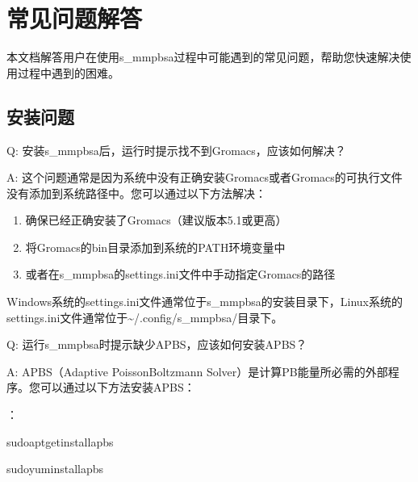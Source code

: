 \documentclass[letterpaper,10pt,english]{sphinxmanual}
\begin{document}
\sphinxstepscope


\chapter{常见问题解答}
\label{\detokenize{faq:id1}}\label{\detokenize{faq::doc}}
\sphinxAtStartPar
本文档解答用户在使用s\_mmpbsa过程中可能遇到的常见问题，帮助您快速解决使用过程中遇到的困难。


\section{安装问题}
\label{\detokenize{faq:id2}}
\sphinxAtStartPar
Q: 安装s\_mmpbsa后，运行时提示找不到Gromacs，应该如何解决？

\sphinxAtStartPar
A: 这个问题通常是因为系统中没有正确安装Gromacs或者Gromacs的可执行文件没有添加到系统路径中。您可以通过以下方法解决：
\begin{enumerate}
%
\item {} 
\sphinxAtStartPar
确保已经正确安装了Gromacs（建议版本5.1或更高）

\item {} 
\sphinxAtStartPar
将Gromacs的bin目录添加到系统的PATH环境变量中

\item {} 
\sphinxAtStartPar
或者在s\_mmpbsa的settings.ini文件中手动指定Gromacs的路径

\end{enumerate}

\sphinxAtStartPar
Windows系统的settings.ini文件通常位于s\_mmpbsa的安装目录下，Linux系统的settings.ini文件通常位于\textasciitilde{}/.config/s\_mmpbsa/目录下。

\sphinxAtStartPar
Q: 运行s\_mmpbsa时提示缺少APBS，应该如何安装APBS？

\sphinxAtStartPar
A: APBS（Adaptive Poisson\sphinxhyphen{}Boltzmann Solver）是计算PB能量所必需的外部程序。您可以通过以下方法安装APBS：

\sphinxAtStartPar
{}：

\begin{sphinxVerbatim}[commandchars=\\\{\}]
sudoapt\PYGZhy{}getinstallapbs

sudoyuminstallapbs
\end{sphinxVerbatim}
\end{document}
